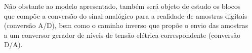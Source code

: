 	Não obstante ao modelo apresentado, também será objeto de estudo os blocos que compõe a conversão do sinal analógico para a realidade de amostras digitais (conversão A/D), bem como o caminho inverso que propõe o envio das amostras a um conversor gerador de níveis de tensão elétrica correspondente (conversão D/A).
	
	
	
	
	

